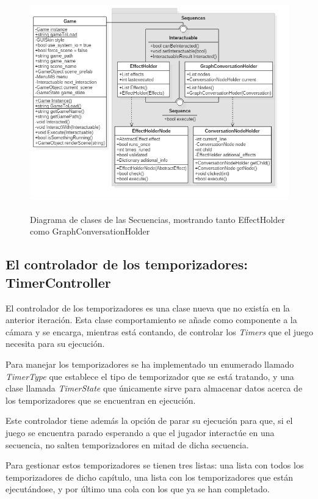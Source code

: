 \begin{figure}[h!]
	\centerline{\includegraphics[height=3.7in]{figures/it2/Sequences.png}}
	\caption[Sequences - Versión Final]{Diagrama de clases de las Secuencias, mostrando tanto EffectHolder como GraphConversationHolder}
	\label{sequencesfigit2}
\end{figure}

\subsection{El controlador de los temporizadores: TimerController}

El controlador de los temporizadores es una clase nueva que no existía en la anterior iteración. Esta clase comportamiento se añade como componente a la cámara y se encarga, mientras está contando, de controlar los \textit{Timers} que el juego necesita para su ejecución.

Para manejar los temporizadores se ha implementado un enumerado llamado \textit{TimerType} que establece el tipo de temporizador que se está tratando, y una clase llamada \textit{TimerState} que únicamente sirve para almacenar datos acerca de los temporizadores que se encuentran en ejecución.

Este controlador tiene además la opción de parar su ejecución para que, si el juego se encuentra parado esperando a que el jugador interactúe en una secuencia, no salten temporizadores en mitad de dicha secuencia. 

Para gestionar estos temporizadores se tienen tres listas:  una lista con todos los temporizadores de dicho capítulo, una lista con los temporizadores que están ejecutándose, y por último una cola con los que ya se han completado.

